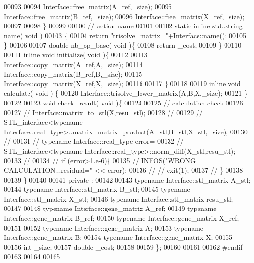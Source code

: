 \begin{DoxyCode}
00093 
00094     Interface::free\_matrix(A\_ref,\_size);
00095     Interface::free\_matrix(B\_ref,\_size);
00096     Interface::free\_matrix(X\_ref,\_size);
00097 
00098   \}
00099 
00100   \textcolor{comment}{// action name}
00101 
00102   \textcolor{keyword}{static} \textcolor{keyword}{inline} std::string name( \textcolor{keywordtype}{void} )
00103   \{
00104     \textcolor{keywordflow}{return} \textcolor{stringliteral}{"trisolve\_matrix\_"}+Interface::name();
00105   \}
00106 
00107   \textcolor{keywordtype}{double} nb\_op\_base( \textcolor{keywordtype}{void} )\{
00108     \textcolor{keywordflow}{return} \_cost;
00109   \}
00110 
00111   \textcolor{keyword}{inline} \textcolor{keywordtype}{void} initialize( \textcolor{keywordtype}{void} )\{
00112 
00113     Interface::copy\_matrix(A\_ref,A,\_size);
00114     Interface::copy\_matrix(B\_ref,B,\_size);
00115     Interface::copy\_matrix(X\_ref,X,\_size);
00116 
00117   \}
00118 
00119   \textcolor{keyword}{inline} \textcolor{keywordtype}{void} calculate( \textcolor{keywordtype}{void} ) \{
00120       Interface::trisolve\_lower\_matrix(A,B,X,\_size);
00121   \}
00122 
00123   \textcolor{keywordtype}{void} check\_result( \textcolor{keywordtype}{void} )\{
00124 
00125     \textcolor{comment}{// calculation check}
00126 
00127 \textcolor{comment}{//     Interface::matrix\_to\_stl(X,resu\_stl);}
00128 \textcolor{comment}{//}
00129 \textcolor{comment}{//     STL\_interface<typename Interface::real\_type>::matrix\_matrix\_product(A\_stl,B\_stl,X\_stl,\_size);}
00130 \textcolor{comment}{//}
00131 \textcolor{comment}{//     typename Interface::real\_type error=}
00132 \textcolor{comment}{//       STL\_interface<typename Interface::real\_type>::norm\_diff(X\_stl,resu\_stl);}
00133 \textcolor{comment}{//}
00134 \textcolor{comment}{//     if (error>1.e-6)\{}
00135 \textcolor{comment}{//       INFOS("WRONG CALCULATION...residual=" << error);}
00136 \textcolor{comment}{// //       exit(1);}
00137 \textcolor{comment}{//     \}}
00138 
00139   \}
00140 
00141 private :
00142 
00143   \textcolor{keyword}{typename} Interface::stl\_matrix A\_stl;
00144   \textcolor{keyword}{typename} Interface::stl\_matrix B\_stl;
00145   \textcolor{keyword}{typename} Interface::stl\_matrix X\_stl;
00146   \textcolor{keyword}{typename} Interface::stl\_matrix resu\_stl;
00147 
00148   \textcolor{keyword}{typename} Interface::gene\_matrix A\_ref;
00149   \textcolor{keyword}{typename} Interface::gene\_matrix B\_ref;
00150   \textcolor{keyword}{typename} Interface::gene\_matrix X\_ref;
00151 
00152   \textcolor{keyword}{typename} Interface::gene\_matrix A;
00153   \textcolor{keyword}{typename} Interface::gene\_matrix B;
00154   \textcolor{keyword}{typename} Interface::gene\_matrix X;
00155 
00156   \textcolor{keywordtype}{int} \_size;
00157   \textcolor{keywordtype}{double} \_cost;
00158 
00159 \};
00160 
00161 
00162 \textcolor{preprocessor}{#endif}
00163 
00164 
00165 
\end{DoxyCode}
